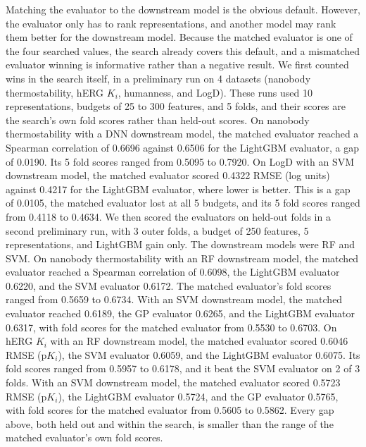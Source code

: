 Matching the evaluator to the downstream model is the obvious default. However, the evaluator only has to rank representations, and another model may rank them better for the downstream model. Because the matched evaluator is one of the four searched values, the search already covers this default, and a mismatched evaluator winning is informative rather than a negative result. We first counted wins in the search itself, in a preliminary run on 4 datasets (nanobody thermostability, hERG $K_i$, humanness, and LogD). These runs used 10 representations, budgets of 25 to 300 features, and 5 folds, and their scores are the search's own fold scores rather than held-out scores. On nanobody thermostability with a DNN downstream model, the matched evaluator reached a Spearman correlation of 0.6696 against 0.6506 for the LightGBM evaluator, a gap of 0.0190. Its 5 fold scores ranged from 0.5095 to 0.7920. On LogD with an SVM downstream model, the matched evaluator scored 0.4322 RMSE (log units) against 0.4217 for the LightGBM evaluator, where lower is better. This is a gap of 0.0105, the matched evaluator lost at all 5 budgets, and its 5 fold scores ranged from 0.4118 to 0.4634. We then scored the evaluators on held-out folds in a second preliminary run, with 3 outer folds, a budget of 250 features, 5 representations, and LightGBM gain only. The downstream models were RF and SVM. On nanobody thermostability with an RF downstream model, the matched evaluator reached a Spearman correlation of 0.6098, the LightGBM evaluator 0.6220, and the SVM evaluator 0.6172. The matched evaluator's fold scores ranged from 0.5659 to 0.6734. With an SVM downstream model, the matched evaluator reached 0.6189, the GP evaluator 0.6265, and the LightGBM evaluator 0.6317, with fold scores for the matched evaluator from 0.5530 to 0.6703. On hERG $K_i$ with an RF downstream model, the matched evaluator scored 0.6046 RMSE (p$K_i$), the SVM evaluator 0.6059, and the LightGBM evaluator 0.6075. Its fold scores ranged from 0.5957 to 0.6178, and it beat the SVM evaluator on 2 of 3 folds. With an SVM downstream model, the matched evaluator scored 0.5723 RMSE (p$K_i$), the LightGBM evaluator 0.5724, and the GP evaluator 0.5765, with fold scores for the matched evaluator from 0.5605 to 0.5862. Every gap above, both held out and within the search, is smaller than the range of the matched evaluator's own fold scores.

